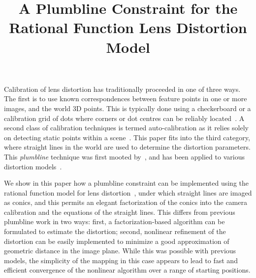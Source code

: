 \documentclass[extendedabs]{bmvc2k}
\begin{document}
\title{A Plumbline Constraint for the Rational Function Lens Distortion Model}

%

\maketitle


\noindent
Calibration of lens distortion has traditionally proceeded in one
of three ways.  The first is to use known correspondences between
feature points in one or more images, and the world 3D points.
This is typically done using a checkerboard or a calibration grid
of dots where corners or dot centres can be reliably
located~\cite{Tsai86}. A second class of calibration techniques is
termed auto-calibration as it relies solely on detecting static
points within a scene~\cite{Zhang96,Fitzgibbon01}.  This paper fits
into the third category, where straight lines in the world are used
to determine the distortion parameters.  This {\em plumbline}
technique was first mooted by~\cite{Brown71}, and has been applied
to various distortion models~\cite{Devernay01,Swaminathan00}.

We show in this paper how a plumbline constraint can be implemented
using the rational function model for lens
distortion~\cite{Claus05}, under which straight lines are imaged as
conics, and this permits an elegant factorization of the conics
into the camera calibration and the equations of the straight
lines.  This differs from previous plumbline work in two ways:
first, a factorization-based algorithm can be formulated to
estimate the distortion; second, nonlinear refinement of the
distortion can be easily implemented to minimize a good
approximation of geometric distance in the image plane.  While this
was possible with previous models, the simplicity of the mapping in
this case appears to lead to fast and efficient convergence of the
nonlinear algorithm over a range of starting positions.
\end{document}
